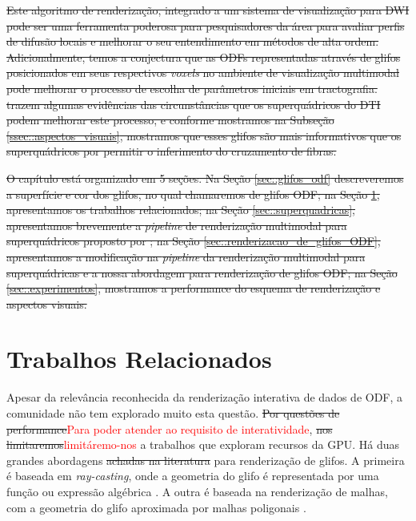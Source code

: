 \documentclass[
    12pt,                %
    oneside,            %
    a4paper,            %
    english,            %
    french,                %
    spanish,            %
    brazil                %
    ]{abntex2}
\begin{document}
\sout{Este algoritmo de renderização, integrado a um sistema de visualização para DWI pode ser uma ferramenta poderosa para pesquisadores da área para avaliar perfis de difusão locais e melhorar o seu entendimento em métodos de alta ordem.
Adicionalmente, temos a conjectura que as ODFs representadas através de glifos posicionados em seus respectivos \textit{voxels} no ambiente de visualização multimodal pode melhorar o processo de escolha de parâmetros iniciais em tractografia.  trazem algumas evidências das circunstâncias que os superquádricos do DTI podem melhorar este processo, e conforme mostramos na Subseção \ref{ssec::aspectos_visuais}, mostramos que esses glifos são mais informativos que os superquádricos por permitir o inferimento do cruzamento de fibras.
}

\sout{O capítulo está organizado em 5 seções. Na Seção \ref{sec::glifos_odf} descreveremos a superfície e cor dos glifos, no qual chamaremos de glifos ODF; na Seção \ref{sec::trabalhos_relacionados}, apresentamos os trabalhos relacionados; na Seção \ref{sec::superquadricas}, apresentamos brevemente a \textit{pipeline} de renderização multimodal para superquádricos proposto por ; na Seção \ref{sec::renderizacao_de_glifos_ODF}, apresentamos a modificação na \textit{pipeline} da renderização multimodal para superquádricas e a nossa abordagem para renderização de glifos ODF; na Seção \ref{sec::experimentos}, mostramos a performance do esquema de renderização e aspectos visuais.}



\section{Trabalhos Relacionados}
\label{sec::trabalhos_relacionados}

Apesar da relevância reconhecida da renderização interativa de dados de ODF, a comunidade não tem explorado muito esta questão. \sout{Por questões de performance}\textcolor{red}{Para poder atender ao requisito de interatividade}, \sout{nos limitaremos}\textcolor{red}{limitáremo-nos} a trabalhos que exploram recursos da GPU. Há duas grandes abordagens \sout{achadas na literatura} para renderização de glifos. A primeira é baseada em \textit{ray-casting}, onde a geometria do glifo é representada por uma função ou expressão algébrica \cite{peeters2009, almsick2011}. A outra é baseada na renderização de malhas, com a geometria do glifo aproximada por malhas poligonais \cite{shattuck2008}.
\end{document}
